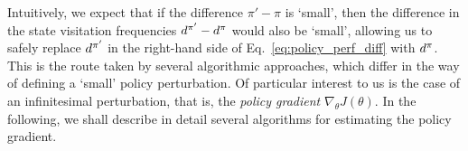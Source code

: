Intuitively, we expect that if the difference $\pi' - \pi$ is `small', then the difference in the state visitation frequencies $d^{\pi'} - d^{\pi}$ would also be `small', allowing us to safely replace $d^{\pi'}$ in the right-hand side of Eq.~\ref{eq:policy_perf_diff} with $d^{\pi}$. This is the route taken by several algorithmic approaches, which differ in the way of defining a `small' policy perturbation. Of particular interest to us is the case of an infinitesimal perturbation, that is, the \textit{policy gradient} $\nabla_{\theta} J(\theta)$. In the following, we shall describe in detail several algorithms for estimating the policy gradient.



